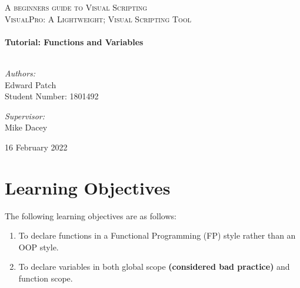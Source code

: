 \documentclass[10pt]{article}
\begin{document}
\begin{center}
\textsc{\LARGE A beginners guide to Visual Scripting}\\[1.5cm]													%

\textsc{\Large VisualPro: A Lightweight; Visual Scripting Tool}\\[0.5cm]

 			\vspace*{1cm}																		%
\HRule \\[0.4cm]																	%
{ \huge \bfseries Tutorial: Functions and Variables}\\[0.4cm]	%
\HRule \\[1.5cm]																	%
\begin{minipage}{0.4\textwidth}													%
\begin{flushleft} \large															
\textit{Authors:}\\
Edward Patch\\
Student Number: 1801492\\
\end{flushleft}																		%
\end{minipage}		
\begin{minipage}{0.5\textwidth}		
\vspace{-0.6cm}											%
\begin{flushright} \large															%
\textit{Supervisor:} \\
Mike Dacey														%
\end{flushright}																	%
\end{minipage}	
\vspace*{1cm}

\vspace{2cm} 																				
\begin{center}																					
{\large 16 February 2022}																	%
 			\end{center}												  						
\end{center}							 											
																					
\newpage																		

\tableofcontents
\thispagestyle{fancy}

\newpage
\section{Learning Objectives}
The following learning objectives are as follows:
\begin{enumerate}
    \item To declare functions in a Functional Programming (FP) style rather than an OOP style.
    \item To declare variables in both global scope \textbf{(considered bad practice)} and function scope.
\end{enumerate}
\end{document}
